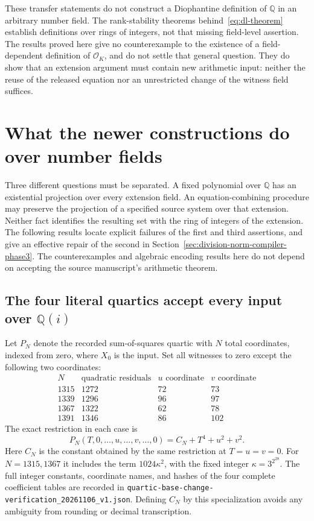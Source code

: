 \documentclass[11pt]{article}
\theoremstyle{definition}
\begin{document}
These transfer statements do not construct a Diophantine definition of
$\mathbb Q$ in an arbitrary number field.  The rank-stability theorems
behind~\eqref{eq:dl-theorem} establish definitions over rings of integers,
not that missing field-level assertion.  The results proved here give
no counterexample to the existence of a field-dependent definition of
$\mathcal O_K$, and do not settle that general question.  They do show
that an extension argument must contain new arithmetic input: neither
the reuse of the released equation nor an unrestricted change of the
witness field suffices.


\section{What the newer constructions do over number fields}
\label{sec:new-constructions-number-fields-phase3}

Three different questions must be separated.  A fixed polynomial
over $\mathbb Q$ has an existential projection over every extension
field.  An equation-combining procedure may preserve the projection
of a specified source system over that extension.  Neither fact
identifies the resulting set with the ring of integers of the
extension.  The following results locate explicit failures of the
first and third assertions, and give an effective repair of the
second in Section~\ref{sec:division-norm-compiler-phase3}.
The counterexamples and algebraic encoding results here do not
depend on accepting the source manuscript's arithmetic theorem.

\subsection{The four literal quartics accept every input over $\mathbb Q(i)$}

Let $P_N$ denote the recorded sum-of-squares quartic with $N$
total coordinates, indexed from zero, where $X_0$ is the input.
Set all witnesses to zero except the following two coordinates:
\[
\begin{array}{r|r|r|r}
N&\text{quadratic residuals}&u\text{ coordinate}&v\text{ coordinate}\\\hline
1315&1272&72&73\\
1339&1296&96&97\\
1367&1322&62&78\\
1391&1346&86&102
\end{array}
\]
The exact restriction in each case is
\begin{equation}\label{eq:quartic-two-squares-restriction-phase3}
                     P_N(T,0,\ldots,u,\ldots,v,\ldots,0)
                        =C_N+T^4+u^2+v^2.
\end{equation}
Here $C_N$ is the constant obtained by the same restriction at
$T=u=v=0$.  For $N=1315,1367$ it includes the term
$1024\kappa^2$, with the fixed integer $\kappa=3^{2^{28}}$.
The full integer constants, coordinate names, and hashes of the
four complete coefficient tables are recorded in
\nolinkurl{quartic-base-change-verification_20261106_v1.json}.
Defining $C_N$ by this specialization avoids any ambiguity from
rounding or decimal transcription.
\end{document}
